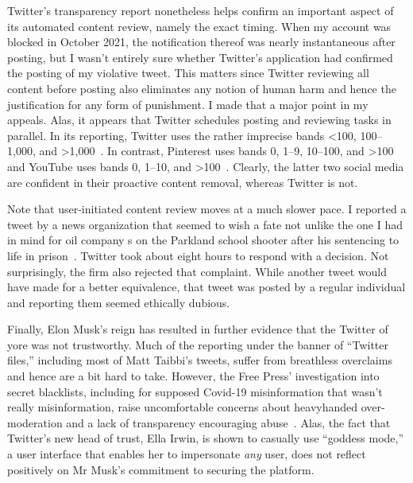 Twitter's transparency report nonetheless helps confirm an important aspect of
its automated content review, namely the exact timing. When my account was
blocked in October 2021, the notification thereof was nearly instantaneous after
posting, but I wasn't entirely sure whether Twitter's application had confirmed
the posting of my violative tweet. This matters since Twitter reviewing all
content before posting also eliminates any notion of human harm and hence the
justification for any form of punishment. I made that a major point in my
appeals. Alas, it appears that Twitter schedules posting and reviewing tasks in
parallel. In its reporting, Twitter uses the rather imprecise bands <100,
100--1,000, and >1,000~\cite{Twitter}. In contrast, Pinterest uses bands 0,
1--9, 10--100, and >100~\cite{Pinterest2022} and YouTube uses bands 0, 1--10,
and >100~\cite{GoogleTransparencyReport}. Clearly, the latter two social media
are confident in their proactive content removal, whereas Twitter is not.

Note that user-initiated content review moves at a much slower pace. I reported
a tweet by a news organization that seemed to wish a fate not unlike the one I
had in mind for oil company \CEO{}s on the Parkland school shooter after his
sentencing to life in prison~\cite{ShapiroDeliso2022}. Twitter took about eight
hours to respond with a decision. Not surprisingly, the firm also rejected that
complaint. While another tweet would have made for a better equivalence, that
tweet was posted by a regular individual and reporting them seemed ethically
dubious.

Finally, Elon Musk's reign has resulted in further evidence that the Twitter of
yore was not trustworthy. Much of the reporting under the banner of ``Twitter
files,'' including most of Matt Taibbi's tweets, suffer from breathless
overclaims and hence are a bit hard to take. However, the Free Press'
investigation into secret blacklists, including for supposed Covid-19
misinformation that wasn't really misinformation, raise uncomfortable concerns
about heavyhanded over-moderation and a lack of transparency encouraging
abuse~\cite{WeissShrierea2022,Zweig2022}. Alas, the fact that Twitter's new head
of trust, Ella Irwin, is shown to casually use ``goddess mode,'' a user
interface that enables her to impersonate \emph{any} user, does not reflect
positively on Mr Musk's commitment to securing the platform.
